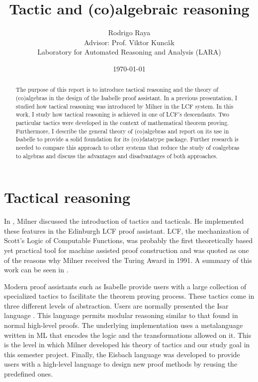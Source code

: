 \documentclass[notitlepage]{article}
\title{Tactic and (co)algebraic reasoning}
\author{Rodrigo Raya\\[0.5cm]{Advisor: Prof. Viktor Kunc\v ak} \\ [0.5cm]{Laboratory for Automated Reasoning and Analysis (LARA) \\ [0.5cm]}}
\date{\today}
\begin{document}
\maketitle
\thispagestyle{empty}

\begin{abstract}
The purpose of this report is to introduce tactical reasoning and the theory of (co)algebras in the design of the Isabelle proof assistant. In a previous presentation, I studied how tactical reasoning was introduced by Milner in the LCF system. In this work, I study how tactical reasoning is achieved in one of LCF's descendants. Two particular tactics were developed in the context of mathematical theorem proving. Furthermore, I describe the general theory of (co)algebras and report on its use in Isabelle to provide a solid foundation for its (co)datatype package. Further research is needed to compare this approach to other systems that reduce the study of coalgebras to algebras and discuss the advantages and disadvantages of both approaches.
\end{abstract}

\section{Tactical reasoning}

In \cite{milner1984use}, Milner discussed the introduction of tactics and tacticals. He implemented these features in the Edinburgh LCF proof assistant. LCF, the mechanization of Scott’s Logic of Computable Functions, was probably the first theoretically based yet practical tool for machine assisted proof construction and was quoted as one of the reasons why Milner received the Turing Award in 1991. A summary of this work can be seen in \cite{presentation}. 

Modern proof assistants such as Isabelle provide users with a large collection of specialized tactics to facilitate the theorem proving process. These tactics come in three different levels of abstraction. Users are normally presented the Isar language \cite{wenzel2002isabelle}. This language permits modular reasoning similar to that found in normal high-level proofs. The underlying implementation uses a metalanguage written in ML that encodes the logic and the transformations allowed on it. This is the level in which Milner developed his theory of tactics and our study goal in this semester project. Finally, the Eisbach language was developed to provide users with a high-level language to design new proof methods by reusing the predefined ones. 
\end{document}
